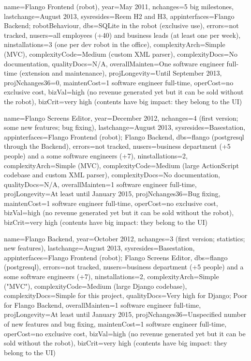 \begin{inventory}
{name=Flango Frontend (robot), 
year=May 2011,
nchanges=5 big milestones,
lastchange=August 2013,
sysresides=Reem H2 and H3,
appinterfaces=Flango Backend; robotBehaviour,
dbs=SQLite in the robot (exclusive use),
errors=not tracked,
nusers=all employees (+40) and business leads (at least one per week),
ninstallations=3 (one per dev robot in the office),
complexityArch=Simple (MVC),
complexityCode=Medium (custom \ac{XML} parser),
complexityDocs=No documentation,
qualityDocs=N/A,
overallMainten=One software engineer full-time (extension and maintenance),
projLongevity=Until September 2013,
projNchanges36=0,
maintenCost=1 software engineer full-time,
operCost=no exclusive cost,
bizVal=high (no revenue generated yet but it can be sold without the robot),
bizCrit=very high (contents have big impact: they belong to the \ac{UI})
}
\end{inventory}

\begin{inventory}
{
name=Flango Screens Editor, 
year=December 2012,
nchanges=4 (first version; some new features; bug fixing),
lastchange=August 2013,
sysresides=Basestation,
appinterfaces=Flango Frontend (robot); Flango Backend,
dbs=flango (postgresql through the Backend),
errors=not tracked,
nusers=business department (+5 people) and a some software engineers (+7),
ninstallations=2,
complexityArch=Simple (MVC),
complexityCode=Medium (large ActionScript codebase and custom \ac{XML} parser),
complexityDocs=No documentation,
qualityDocs=N/A,
overallMainten=1 software engineer full-time,
projLongevity=At least until January 2015,
projNchanges36=Bug fixing,
maintenCost=1 software engineer full-time,
operCost=no exclusive cost,
bizVal=high (no revenue generated yet but it can be sold without the robot),
bizCrit=very high (contents have big impact: they belong to the \ac{UI})
}
\end{inventory}

\begin{inventory}
{
name=Flango Backend, 
year=October 2012,
nchanges=3 (first version; statistics; new features),
lastchange=August 2013,
sysresides=Basestation,
appinterfaces=Flango Frontend (robot); Flango Screens Editor,
dbs=flango (postgresql),
errors=not tracked,
nusers=business department (+5 people) and a some software engineers (+7),
ninstallations=2,
complexityArch=Simple ("MVC"),
complexityCode=Medium (large Django codebase),
complexityDocs=Simple for this project,
qualityDocs=Very high for Django; Poor for Flango Backend,
overallMainten=1 software engineer full-time,
projLongevity=At least until January 2015,
projNchanges36=Unspecified number of new features and bug fixing,
maintenCost=1 software engineer full-time,
operCost=no exclusive cost,
bizVal=high (no revenue generated yet but it can be sold without the robot),
bizCrit=very high (contents have big impact: they belong to the \ac{UI})
}
\end{inventory}    

